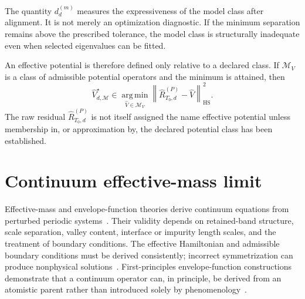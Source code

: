 The quantity $d_d^{(m)}$ measures the expressiveness of the model class after
alignment. It is not merely an optimization diagnostic. If the minimum
separation remains above the prescribed tolerance, the model class is
structurally inadequate even when selected eigenvalues can be fitted.

An effective potential is therefore defined only relative to a declared class.
If $\mathcal M_V$ is a class of admissible potential operators and the minimum
is attained, then
\begin{equation}
    \hat V_{d,\mathcal M}^{\star}
    \in
    \operatorname*{arg\,min}_{\hat V\in\mathcal M_V}
    \left\lVert
        \hat R_{T_0,d}^{(P)}-\hat V
    \right\rVert_{\mathrm{HS}}^2.
\end{equation}
The raw residual $\hat R_{T_0,d}^{(P)}$ is not itself assigned the name
effective potential unless membership in, or approximation by, the declared
potential class has been established.

\section*{Continuum effective-mass limit}

Effective-mass and envelope-function theories derive continuum equations from
perturbed periodic systems~\cite{luttingerKohn1955,burt1992,burt1999}. Their
validity depends on retained-band structure, scale separation, valley content,
interface or impurity length scales, and the treatment of boundary conditions.
The effective Hamiltonian and admissible boundary conditions must be derived
consistently; incorrect symmetrization can produce nonphysical
solutions~\cite{foreman1993}. First-principles envelope-function constructions
demonstrate that a continuum operator can, in principle, be derived from an
atomistic parent rather than introduced solely by
phenomenology~\cite{foreman2005}.

